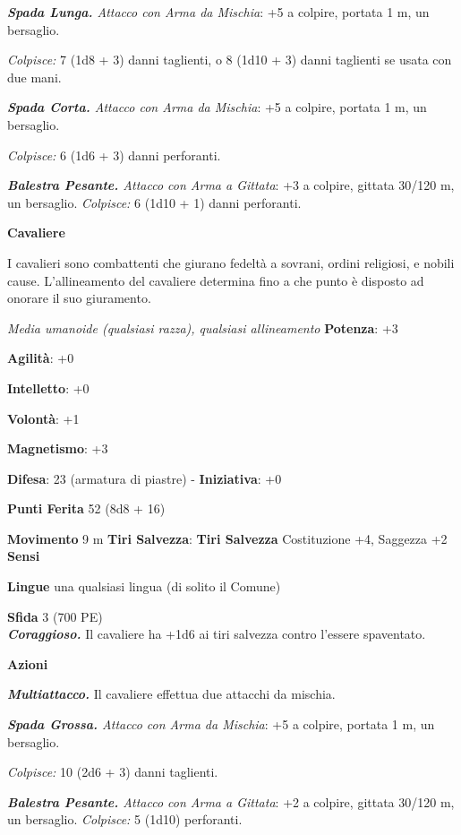 \begin{multicols}{2}
\emph{\textbf{Spada Lunga.} Attacco con Arma da Mischia}: +5 a colpire,
portata 1 m, un bersaglio.

\emph{Colpisce:} 7 (1d8 + 3) danni taglienti, o 8 (1d10 + 3) danni
taglienti se usata con due mani.

\emph{\textbf{Spada Corta.} Attacco con Arma da Mischia}: +5 a colpire,
portata 1 m, un bersaglio.

\emph{Colpisce:} 6 (1d6 + 3) danni perforanti.

\emph{\textbf{Balestra Pesante.} Attacco con Arma a Gittata}: +3 a
colpire, gittata 30/120 m, un bersaglio. \emph{Colpisce:} 6 (1d10 + 1)
danni perforanti.

\textbf{Cavaliere}

I cavalieri sono combattenti che giurano fedeltà a sovrani, ordini
religiosi, e nobili cause. L'allineamento del cavaliere determina fino a
che punto è disposto ad onorare il suo giuramento.

\emph{Media umanoide (qualsiasi razza), qualsiasi allineamento}
\textbf{Potenza}: +3

\textbf{Agilità}: +0

\textbf{Intelletto}: +0

\textbf{Volontà}: +1

\textbf{Magnetismo}: +3

\textbf{Difesa}: 23 (armatura di piastre) - \textbf{Iniziativa}: +0

\textbf{Punti Ferita} 52 (8d8 + 16)

\textbf{Movimento} 9 m
\textbf{Tiri Salvezza}:
\textbf{Tiri Salvezza} Costituzione +4, Saggezza +2 \textbf{Sensi}


\textbf{Lingue} una qualsiasi lingua (di solito il Comune)

\textbf{Sfida} 3 (700 PE)\smallskip\\

\emph{\textbf{Coraggioso.}} Il cavaliere ha +1d6 ai tiri salvezza
contro l'essere spaventato.

\smallskip\textbf{Azioni}

\emph{\textbf{Multiattacco.}} Il cavaliere effettua due attacchi da
mischia.

\emph{\textbf{Spada Grossa.} Attacco con Arma da Mischia}: +5 a colpire,
portata 1 m, un bersaglio.

\emph{Colpisce:} 10 (2d6 + 3) danni taglienti.

\emph{\textbf{Balestra Pesante.} Attacco con Arma a Gittata}: +2 a
colpire, gittata 30/120 m, un bersaglio. \emph{Colpisce:} 5 (1d10)
perforanti.


\end{multicols}
